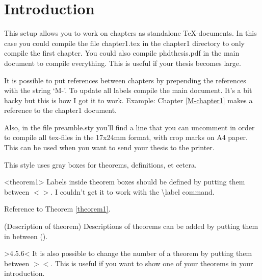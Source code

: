 \documentclass[../phdthesis]{subfiles}
\begin{document}
\ifSubfilesClassLoaded{\frontmatter}{}
\chapter{Introduction}
This setup allows you to work on chapters as standalone TeX-documents.
In this case you could compile the file chapter1.tex in the chapter1 directory to only compile the first chapter.
You could also compile phdthesis.pdf in the main document to compile everything.
This is useful if your thesis becomes large.

It is possible to put references between chapters by prepending the references with the string `M-'.
To update all labels compile the main document.
It's a bit hacky but this is how I got it to work.
Example: Chapter \ref{M-chapter1} makes a reference to the chapter1 document.

Also, in the file preamble.sty you'll find a line that you can uncomment in order to compile all tex-files in the 17x24mm format, with crop marks on A4 paper.
This can be used when you want to send your thesis to the printer.

\begin{definition}
	This style uses gray boxes for theorems, definitions, et cetera.
\end{definition}
\begin{theorem}<theorem1>
	Labels inside theorem boxes should be defined by putting them between \(<>\).
	I couldn't get it to work with the \textbackslash label command.
\end{theorem}
Reference to Theorem \ref{theorem1}.

\begin{theorem}(Description of theorem)
	Descriptions of theorems can be added by putting them in between ().
\end{theorem}

\begin{theorem}>4.5.6<
	It is also possible to change the number of a theorem by putting them between \(><\). This is useful if you want to show one of your theorems in your introduction.
\end{theorem}



\ifSubfilesClassLoaded{
	\printbibliography
}{}
\end{document}
